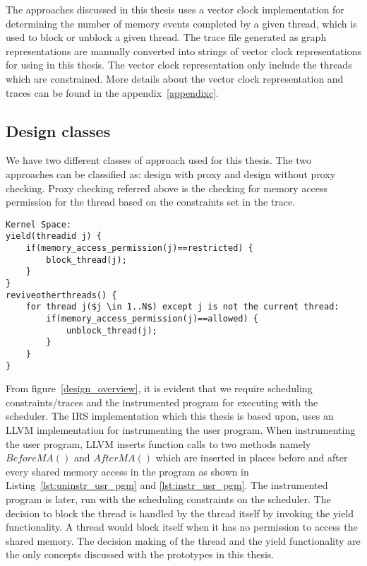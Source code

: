 The approaches discussed in this thesis uses a vector clock implementation for determining the number of memory events completed by a given thread, which is used to block or unblock a given thread. 
The trace file generated as graph representations are manually converted into strings of vector clock representations for using in this thesis. 
The vector clock representation only include the threads which are constrained. 
More details about the vector clock representation and traces can be found in the appendix~\ref{appendixc}.


\subsection{Design classes}

We have two different classes of approach used for this thesis. 
The two approaches can be classified as: design with proxy and design without proxy checking. 
Proxy checking referred above is the checking for memory  access permission for the thread based on the constraints set in the trace. 

\begin{lstlisting}[mathescape=true,style=customc,caption={Yield functionality and thread revival},frame=tlrb,label={lst:yield_func}]
Kernel Space:
yield(threadid j) {
	if(memory_access_permission(j)==restricted) {
		block_thread(j);
	}
}
reviveotherthreads() {
	for thread j($j \in 1..N$) except j is not the current thread:
		if(memory_access_permission(j)==allowed) {
			unblock_thread(j);
		}	
	}
}
\end{lstlisting}
From figure~\ref{design_overview}, it is evident that we require scheduling constraints/traces and the instrumented program for executing with the scheduler. 
The IRS implementation which this thesis is based upon, uses an LLVM implementation for instrumenting the user program. 
When instrumenting the user program, LLVM inserts function calls to two methods namely $BeforeMA()$ and $AfterMA()$ which are inserted in places before and after every shared memory access in the program as shown in Listing~\ref{lst:uninstr_usr_pgm} and \ref{lst:instr_usr_pgm}. 
The instrumented program is later, run with the scheduling constraints on the scheduler. 
The decision to block the thread is handled by the thread itself by invoking the yield functionality. 
A thread would block itself when it has no permission to access the shared memory. 
The decision making of the thread and the yield functionality are the only concepts discussed with the prototypes in this thesis. 

